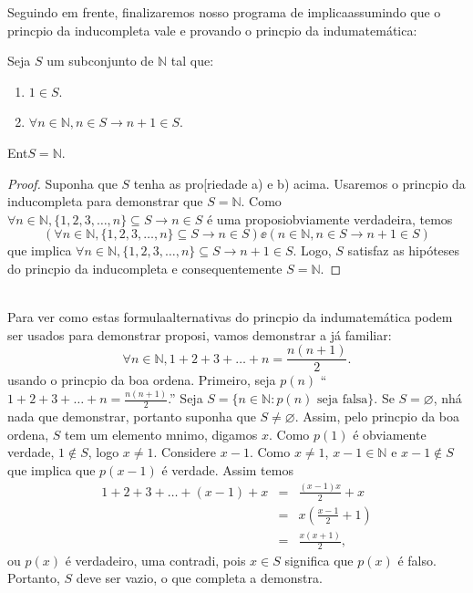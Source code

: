 Seguindo em frente, finalizaremos nosso programa de implica\coes assumindo que o princ\ih pio da indu\cao completa vale e provando o princ\ih pio da indu\cao matem\'atica:
\begin{teob}\label{indteo3}
Seja $S$ um subconjunto de $\mathbb{N}$ tal que:
\begin{enumerate}[{\bf a)}]
\item $1\in S$.
\item $\forall n\in \mathbb{N}, n\in S \rightarrow n+1\in S$. 
\end{enumerate}
Ent\ao $S=\mathbb{N}$. 
\end{teob}
\begin{proof}
Suponha que $S$ tenha as pro[riedade a) e b) acima. Usaremos o princ\ih pio da indu\cao completa para demonstrar que $S=\mathbb{N}$. Como $\forall n \in\mathbb{N}, \{1,2,3,\ldots,n\}\subseteq S \rightarrow n\in S$ \'e uma proposi\cao obviamente verdadeira, temos
\[
(\forall n \in\mathbb{N}, \{1,2,3,\ldots,n\}\subseteq S \rightarrow n\in S)\ee(n\in \mathbb{N}, n\in S \rightarrow n+1\in S)
\] 
que implica $\forall n \in\mathbb{N}, \{1,2,3,\ldots,n\}\subseteq S \rightarrow n+1\in S$. Logo, $S$ satisfaz as hip\'oteses do princ\ih pio da indu\cao completa e consequentemente $S=\mathbb{N}$.
\end{proof}
\\


Para ver como estas formula\coes alternativas do princ\ih pio da indu\cao matem\'atica podem ser usados para demonstrar proposi\cois, vamos demonstrar a j\'a familiar:
\[
\forall n\in\mathbb{N}, 1+2+3+\ldots+n=\frac{n(n+1)}{2}.
\]
usando o princ\ih pio da boa ordena\caoi. Primeiro, seja $p(n)$ ``$1+2+3+\ldots+n=\frac{n(n+1)}{2}$.'' Seja $S=\{n\in\mathbb{N}: p(n) \textrm{ seja falsa}\}$. Se $S=\varnothing$, n\ao h\'a nada que demonstrar, portanto suponha que $S\neq\varnothing$. Assim, pelo princ\ih pio da boa ordena\caoi, $S$ tem um elemento m\ih nimo, digamos $x$. Como $p(1)$ \'e obviamente verdade, $1\notin S$, logo $x\neq 1$. Considere $x-1$. Como $x\neq 1$, $x-1\in\mathbb{N}$ e $x-1\notin S$ que implica que $p(x-1)$ \'e verdade. Assim temos
\begin{eqnarray*}
1+2+3+\ldots+(x-1)+x &=& \frac{(x-1)x}{2}+x\\
                  &=& x\left(\frac{x-1}{2}+1\right) \\
                  &=& \frac{x(x+1)}{2},
\end{eqnarray*} 
ou $p(x)$ \'e verdadeiro, uma contradi\caoi, pois $x\in S$ significa que $p(x)$ \'e falso. Portanto, $S$ deve ser vazio, o que completa a demonstra\caoi.

